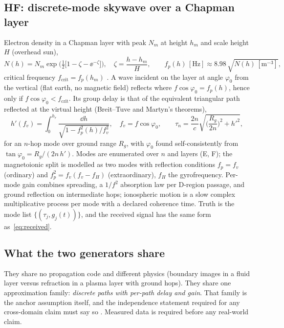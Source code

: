 \subsection[HF: discrete-mode skywave over a Chapman layer]{HF: discrete-mode skywave over a Chapman layer\hfill{\normalfont\small \tagP{}}}
\label{sec:hf}

Electron density in a Chapman layer with peak $N_m$ at height $h_m$ and scale height $H$ (overhead sun),
\begin{equation}
  N(h) = N_m\exp\!\Big(\tfrac12\big[1-\zeta-\ee^{-\zeta}\big]\Big),\quad \zeta=\frac{h-h_m}{H},
  \qquad
  f_p(h)\,[\mathrm{Hz}] \approx 8.98\,\sqrt{N(h)\,[\mathrm{m}^{-3}]} ,
  \label{eq:chapman}
\end{equation}
critical frequency $f_{\mathrm{crit}}=f_p(h_m)$ \citep{davies1990}. A wave incident on the layer at angle $\varphi_0$ from the vertical (flat earth, no magnetic field) reflects where $f\cos\varphi_0=f_p(h)$, hence only if $f\cos\varphi_0<f_{\mathrm{crit}}$. Its group delay is that of the equivalent triangular path reflected at the virtual height (Breit--Tuve and Martyn's theorems),
\begin{equation}
  h'(f_v)=\int_0^{h_r}\frac{\dd h}{\sqrt{1-f_p^2(h)/f_v^2}},\quad f_v=f\cos\varphi_0,
  \qquad
  \tau_{n} = \frac{2n}{c}\sqrt{\Big(\frac{R_g}{2n}\Big)^2+h'^2},
  \label{eq:hf-delay}
\end{equation}
for an $n$-hop mode over ground range $R_g$, with $\varphi_0$ found self-consistently from $\tan\varphi_0=R_g/(2n\,h')$. Modes are enumerated over $n$ and layers (E, F); the magnetoionic split is modelled as two modes with reflection conditions $f_p=f_v$ (ordinary) and $f_p^2=f_v(f_v-f_H)$ (extraordinary), $f_H$ the gyrofrequency. Per-mode gain combines spreading, a $1/f^2$ absorption law per D-region passage, and ground reflection on intermediate hops; ionospheric motion is a slow complex multiplicative process per mode with a declared coherence time. Truth is the mode list $\{(\tau_j, g_j(t))\}$, and the received signal has the same form as~\eqref{eq:received}.

\subsection{What the two generators share}

They share no propagation code and different physics (boundary images in a fluid layer versus refraction in a plasma layer with ground hops). They share one approximation family: \emph{discrete paths with per-path delay and gain}. That family is the anchor assumption itself, and the independence statement required for any cross-domain claim must say so \tagG{}. Measured data is required before any real-world claim.

